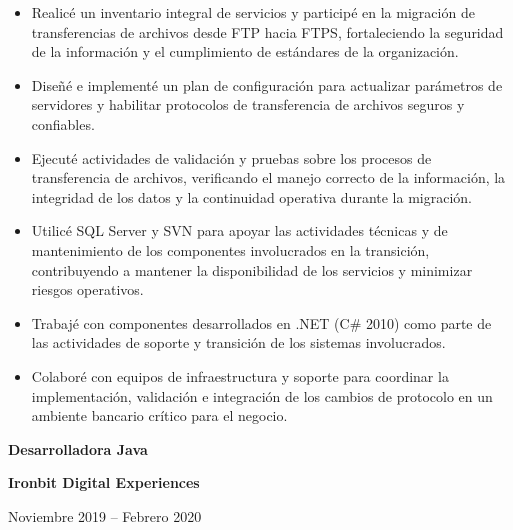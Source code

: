 \documentclass[10pt,letterpaper]{article}
\newcommand{\jobtitle}[1]{
    {\bfseries #1}
}
\newcommand{\company}[1]{
    {\bfseries\color{DarkGray} #1}
}
\newcommand{\jobdate}[1]{
    {\color{MediumGray} #1}
}
\begin{document}
\begin{itemize}

\item Realicé un inventario integral de servicios y participé en la migración de transferencias de archivos desde FTP hacia FTPS, fortaleciendo la seguridad de la información y el cumplimiento de estándares de la organización.

\item Diseñé e implementé un plan de configuración para actualizar parámetros de servidores y habilitar protocolos de transferencia de archivos seguros y confiables.

\item Ejecuté actividades de validación y pruebas sobre los procesos de transferencia de archivos, verificando el manejo correcto de la información, la integridad de los datos y la continuidad operativa durante la migración.

\item Utilicé SQL Server y SVN para apoyar las actividades técnicas y de mantenimiento de los componentes involucrados en la transición, contribuyendo a mantener la disponibilidad de los servicios y minimizar riesgos operativos.

\item Trabajé con componentes desarrollados en .NET (C# 2010) como parte de las actividades de soporte y transición de los sistemas involucrados.

\item Colaboré con equipos de infraestructura y soporte para coordinar la implementación, validación e integración de los cambios de protocolo en un ambiente bancario crítico para el negocio.

\end{itemize}

\jobtitle{Desarrolladora Java} \textbar{}
\company{Ironbit Digital Experiences}
\hfill \textbar{}
\jobdate{Noviembre 2019 -- Febrero 2020}
\end{document}
